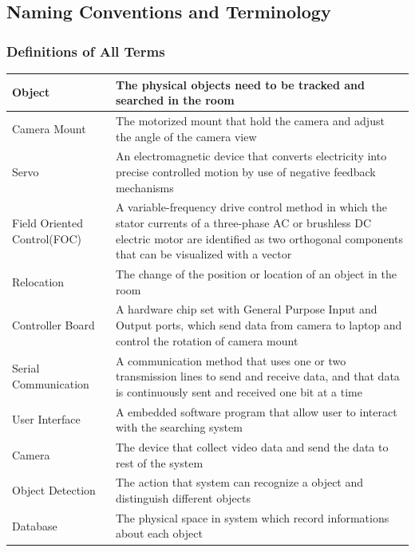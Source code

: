 \documentclass[12pt]{article}
\begin{document}
\subsection{Naming Conventions and Terminology}
	\subsubsection{Definitions of All Terms}
		\begin{center}
    		\begin{tabular}{|| p{3cm} || p{8cm} ||}
   			 	\hline
    			Object& The physical objects need to be tracked and searched in the room  \\
   				\hline
    			Camera Mount & The motorized mount that hold the camera and adjust the angle of the camera view \\
    			\hline
   				 Servo  & An electromagnetic device that converts electricity into precise controlled motion by use of negative feedback mechanisms\\
    			\hline
   			 Field Oriented Control(FOC) & A variable-frequency drive control method in which the stator currents of a three-phase AC or brushless DC electric motor are identified as two orthogonal components that can be visualized with a vector\\
    			\hline
    			Relocation & The change of the position or location of an object in the room\\
    			\hline
   				Controller Board & A hardware chip set with General Purpose Input and Output ports, which send data from camera to laptop and control the rotation of camera mount\\
   				\hline
   				Serial Communication & A communication method that uses one or two transmission lines to send and receive data, and that data is continuously sent and received one bit at a time\\
   				\hline
   				User Interface & A embedded software program that allow user to interact with the searching system\\
   				\hline
   				Camera & The device that collect video data and send the data to rest of the system\\
   				\hline 
   				Object Detection & The action that system can recognize a object and distinguish different objects\\
   				\hline
   				Database & The physical space in system which record informations about each object\\
    \hline\hline
    \end{tabular}
\end{center}
	
\end{document}
